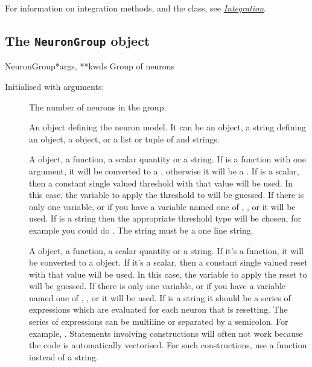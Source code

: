 \documentclass[letterpaper,10pt,english]{manual}
\begin{document}
For information on integration methods, and the 
class, see \hyperlink{integration}{\emph{Integration}}.


\subsection{The \texttt{NeuronGroup} object}

\hypertarget{brian.NeuronGroup}{}\begin{classdesc}{NeuronGroup}{*args, **kwds}
Group of neurons

Initialised with arguments:
\begin{description}
\item[] \leavevmode
The number of neurons in the group.

\item[] \leavevmode
An object defining the neuron model. It can be
an \hyperlink{brian.Equations}{} object, a string defining an \hyperlink{brian.Equations}{} object,
a  object, or a list or tuple of \hyperlink{brian.Equations}{} and
strings.

\item[] \leavevmode
A \hyperlink{brian.Threshold}{} object, a function, a scalar quantity or a string.
If  is a function with one argument, it will be
converted to a \hyperlink{brian.SimpleFunThreshold}{}, otherwise it will be a
\hyperlink{brian.FunThreshold}{}. If  is a scalar, then a constant
single valued threshold with that value will be used. In this case,
the variable to apply the threshold to will be guessed. If there is
only one variable, or if you have a variable named one of
, ,  or  it will be used. If  is a
string then the appropriate threshold type will be chosen, for example
you could do . The string must be a one line
string.

\item[] \leavevmode
A \hyperlink{brian.Reset}{} object, a function, a scalar quantity or a string. If it's a
function, it will be converted to a \hyperlink{brian.FunReset}{} object. If it's
a scalar, then a constant single valued reset with that value will
be used. In this case,
the variable to apply the reset to will be guessed. If there is
only one variable, or if you have a variable named one of
, ,  or  it will be used. If  is a
string it should be a series of expressions which are evaluated for
each neuron that is resetting. The series of expressions can be
multiline or separated by a semicolon. For example,
. Statements involving  constructions
will often not work because the code is automatically vectorised.
For such constructions, use a function instead of a string.


\end{description}
\end{classdesc}
\end{document}
